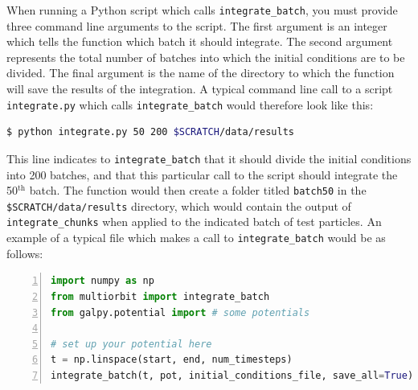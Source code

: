 \documentclass[10pt]{article}
\begin{document}
When running a Python script which calls \texttt{integrate\_batch}, you must provide three command line arguments to the script. The first argument is an integer which tells the function which batch it should integrate. The second argument represents the total number of batches into which the initial conditions are to be divided. The final argument is the name of the directory to which the function will save the results of the integration. A typical command line call to a script \texttt{integrate.py} which calls \texttt{integrate\_batch} would therefore look like this:
\begin{lstlisting}[language=bash]
$ python integrate.py 50 200 $SCRATCH/data/results
\end{lstlisting}
This line indicates to \texttt{integrate\_batch} that it should divide the initial conditions into 200 batches, and that this particular call to the script should integrate the 50$^{\mathrm{th}}$ batch. The function would then create a folder titled \texttt{batch50} in the \texttt{\$SCRATCH/data/results} directory, which would contain the output of \texttt{integrate\_chunks} when applied to the indicated batch of test particles. An example of a typical file which makes a call to \texttt{integrate\_batch} would be as follows:
\begin{lstlisting}[language=Python, numbers=left]
import numpy as np
from multiorbit import integrate_batch
from galpy.potential import # some potentials

# set up your potential here
t = np.linspace(start, end, num_timesteps)
integrate_batch(t, pot, initial_conditions_file, save_all=True)
\end{lstlisting}
\end{document}
